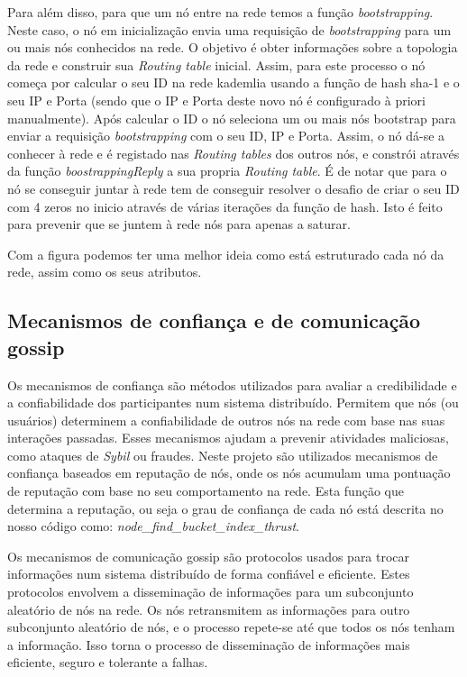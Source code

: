 \documentclass[conference]{IEEEtran}
\begin{document}
    Para além disso, para que um nó entre na rede temos a função \textit{bootstrapping}. Neste caso, o nó em inicialização envia uma requisição de \textit{bootstrapping} para um ou mais nós conhecidos na rede. O objetivo é obter informações sobre a topologia da rede e construir sua \textit{Routing table} inicial. Assim, para este processo o nó começa por calcular o seu ID na rede kademlia usando a função de hash sha-1 e o seu IP e Porta (sendo que o IP e Porta deste novo nó é configurado à priori manualmente). Após calcular o ID o nó seleciona um ou mais nós bootstrap para enviar a requisição \textit{bootstrapping} com o seu ID, IP e Porta. Assim, o nó dá-se a conhecer à rede e é registado nas \textit{Routing tables} dos outros nós, e constrói através da função \textit{boostrappingReply} a sua propria \textit{Routing table}.
    É de notar que para o nó se conseguir juntar à rede tem de conseguir resolver o desafio de criar o seu ID com 4 zeros no inicio através de várias iterações da função de hash. Isto é feito para prevenir que se juntem à rede nós para apenas a saturar.

    Com a figura \cite{1} podemos ter uma melhor ideia como está estruturado cada nó da rede, assim como os seus atributos.

    \subsection{Mecanismos de confiança e de comunicação gossip}
    Os mecanismos de confiança são métodos utilizados para avaliar a credibilidade e a confiabilidade dos participantes num sistema distribuído. Permitem que nós (ou usuários) determinem a confiabilidade de outros nós na rede com base nas suas interações passadas. Esses mecanismos ajudam a prevenir atividades maliciosas, como ataques de \textit{Sybil} ou fraudes.
    Neste projeto são utilizados mecanismos de confiança baseados em reputação de nós, onde os nós acumulam uma pontuação de reputação com base no seu comportamento na rede. Esta função que determina a reputação, ou seja o grau de confiança de cada nó está descrita no nosso código como: \textit{node\_find\_bucket\_index\_thrust}.

    Os mecanismos de comunicação gossip são protocolos usados para trocar informações num sistema distribuído de forma confiável e eficiente. Estes protocolos envolvem a disseminação de informações para um subconjunto aleatório de nós na rede. Os nós retransmitem as informações para outro subconjunto aleatório de nós, e o processo repete-se até que todos os nós tenham a informação. Isso torna o processo de disseminação de informações mais eficiente, seguro e tolerante a falhas.
\end{document}

